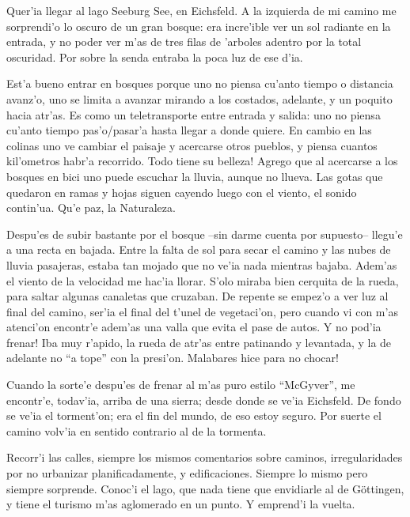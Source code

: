 Quer'ia llegar al lago Seeburg See, en Eichsfeld. A la izquierda de mi camino me
sorprendi'o lo oscuro de un gran bosque: era incre'ible ver un sol radiante en
la entrada, y no poder ver m'as de tres filas de 'arboles adentro por la total
oscuridad. Por sobre la senda entraba la poca luz de ese d'ia.

Est'a bueno entrar en bosques porque uno no piensa cu'anto tiempo o distancia
avanz'o, uno se limita a avanzar mirando a los costados, adelante, y un poquito
hacia atr'as. Es como un teletransporte entre entrada y salida: uno no piensa
cu'anto tiempo pas'o/pasar'a hasta llegar a donde quiere. En cambio en las
colinas uno ve cambiar el paisaje y acercarse otros pueblos, y piensa cuantos
kil'ometros habr'a recorrido. \textexclamdown Todo tiene su belleza! Agrego que
al acercarse a los bosques en bici uno puede escuchar la lluvia, aunque no
llueva. Las gotas que quedaron en ramas y hojas siguen cayendo luego con el
viento, el sonido contin'ua. Qu'e paz, la Naturaleza.

Despu'es de subir bastante por el bosque --sin darme cuenta por supuesto--
llegu'e a una recta en bajada. Entre la falta de sol para secar el camino y las
nubes de lluvia pasajeras, estaba tan mojado que no ve'ia nada mientras bajaba.
Adem'as el viento de la velocidad me hac'ia llorar. S'olo miraba bien cerquita
de la rueda, para saltar algunas canaletas que cruzaban. De repente se empez'o a
ver luz al final del camino, ser'ia el final del t'unel de vegetaci'on, pero
cuando vi con m'as atenci'on encontr'e adem'as una valla que evita el pase de
autos. \textexclamdown Y no pod'ia frenar! Iba muy r'apido, la rueda de atr'as
entre patinando y levantada, y la de adelante no ``a tope'' con la presi'on.
\textexclamdown Malabares hice para no chocar!

Cuando la sorte'e despu'es de frenar al m'as puro estilo ``McGyver'', me
encontr'e, todav'ia, arriba de una sierra; desde donde se ve'ia Eichsfeld. De
fondo se ve'ia el torment'on; era el fin del mundo, de eso estoy seguro. Por
suerte el camino volv'ia en sentido contrario al de la tormenta.

Recorr'i las calles, siempre los mismos comentarios sobre caminos,
irregularidades por no urbanizar planificadamente, y edificaciones. Siempre lo
mismo pero siempre sorprende. Conoc'i el lago, que nada tiene que envidiarle al
de G\"ottingen, y tiene el turismo m'as aglomerado en un punto. Y emprend'i la
vuelta.

